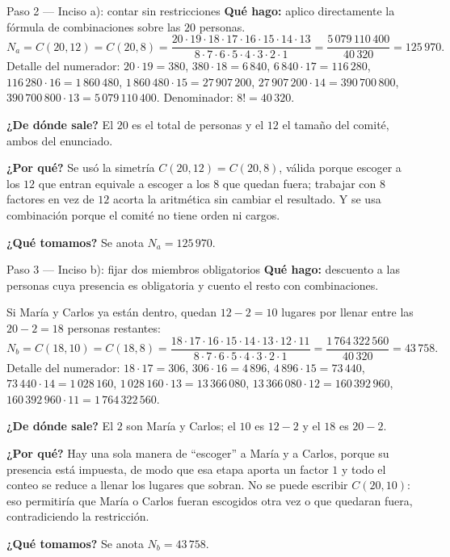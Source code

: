 \documentclass[11pt]{article}
\begin{document}
\begin{paso}{Paso 2 --- Inciso a): contar sin restricciones}
\textbf{Qué hago:} aplico directamente la fórmula de combinaciones sobre las $20$ personas.
\[
  N_a=C(20,12)=C(20,8)=\frac{20\cdot 19\cdot 18\cdot 17\cdot 16\cdot 15\cdot 14\cdot 13}{8\cdot 7\cdot 6\cdot 5\cdot 4\cdot 3\cdot 2\cdot 1}
     =\frac{5\,079\,110\,400}{40\,320}=125\,970 .
\]
Detalle del numerador: $20\cdot 19=380$, $380\cdot 18=6\,840$, $6\,840\cdot 17=116\,280$, $116\,280\cdot 16=1\,860\,480$, $1\,860\,480\cdot 15=27\,907\,200$, $27\,907\,200\cdot 14=390\,700\,800$, $390\,700\,800\cdot 13=5\,079\,110\,400$. Denominador: $8!=40\,320$.

\textbf{¿De dónde sale?} El $20$ es el total de personas y el $12$ el tamaño del comité, ambos del enunciado.

\textbf{¿Por qué?} Se usó la simetría $C(20,12)=C(20,8)$, válida porque escoger a los $12$ que entran equivale a escoger a los $8$ que quedan fuera; trabajar con $8$ factores en vez de $12$ acorta la aritmética sin cambiar el resultado. Y se usa combinación porque el comité no tiene orden ni cargos.

\textbf{¿Qué tomamos?} Se anota $N_a=125\,970$.
\end{paso}

\begin{paso}{Paso 3 --- Inciso b): fijar dos miembros obligatorios}
\textbf{Qué hago:} descuento a las personas cuya presencia es obligatoria y cuento el resto con combinaciones.

Si María y Carlos ya están dentro, quedan $12-2=10$ lugares por llenar entre las $20-2=18$ personas restantes:
\[
  N_b=C(18,10)=C(18,8)=\frac{18\cdot 17\cdot 16\cdot 15\cdot 14\cdot 13\cdot 12\cdot 11}{8\cdot 7\cdot 6\cdot 5\cdot 4\cdot 3\cdot 2\cdot 1}=\frac{1\,764\,322\,560}{40\,320}=43\,758 .
\]
Detalle del numerador: $18\cdot 17=306$, $306\cdot 16=4\,896$, $4\,896\cdot 15=73\,440$, $73\,440\cdot 14=1\,028\,160$, $1\,028\,160\cdot 13=13\,366\,080$, $13\,366\,080\cdot 12=160\,392\,960$, $160\,392\,960\cdot 11=1\,764\,322\,560$.

\textbf{¿De dónde sale?} El $2$ son María y Carlos; el $10$ es $12-2$ y el $18$ es $20-2$.

\textbf{¿Por qué?} Hay una sola manera de ``escoger'' a María y a Carlos, porque su presencia está impuesta, de modo que esa etapa aporta un factor $1$ y todo el conteo se reduce a llenar los lugares que sobran. No se puede escribir $C(20,10)$: eso permitiría que María o Carlos fueran escogidos otra vez o que quedaran fuera, contradiciendo la restricción.

\textbf{¿Qué tomamos?} Se anota $N_b=43\,758$.
\end{paso}
\end{document}
